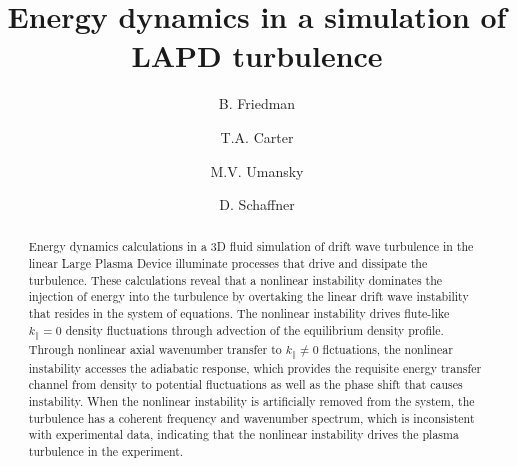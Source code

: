 \documentclass[showpacs,preprintnumbers,amsmath,amssymb,superscriptaddress]{revtex4}
\begin{document}
\title{Energy dynamics in a simulation of LAPD turbulence}

\author{B. Friedman}

\author{T.A. Carter}


\author{M.V. Umansky}

\author{D. Schaffner}






\begin{abstract}
Energy dynamics calculations in a 3D fluid simulation of drift wave turbulence in the linear Large Plasma Device \cite{Gekelman1991} illuminate processes that drive and dissipate the turbulence.
These calculations reveal that a nonlinear instability dominates the injection of energy into the turbulence by overtaking the linear drift wave instability that resides in the system of equations.
The nonlinear instability drives flute-like $k_\parallel = 0$ density fluctuations through advection of the equilibrium density profile. 
Through nonlinear axial wavenumber transfer to $k_\parallel \ne 0$ flctuations, the nonlinear instability accesses the adiabatic response, 
which provides the requisite energy transfer channel from density to potential fluctuations as well as the
phase shift that causes instability. When the nonlinear instability is artificially removed from the system, the turbulence has a coherent frequency and wavenumber spectrum, which is inconsistent
with experimental data, indicating that the nonlinear instability drives the plasma turbulence in the experiment.
\end{abstract}

\maketitle
\end{document}
